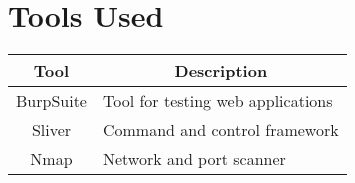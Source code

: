 \section{Tools Used}
\begin{fullwidth}
\begin{table}[htp]
\centering
\begin{tabular}{|c|l|}
\hline
\rowcolor[HTML]{C0C0C0} 
\textbf{Tool} & \multicolumn{1}{c|}{\cellcolor[HTML]{C0C0C0}\textbf{Description}}              \\ \hline
\rowcolor[HTML]{FFFFFF} 
BurpSuite     & \multicolumn{1}{p{5.6in}|}{\cellcolor[HTML]{FFFFFF}Tool for testing web applications} \\ \hline
Sliver & Command and control framework \\ \hline
Nmap   & Network and port scanner      \\ \hline
\end{tabular}
\end{table}
\end{fullwidth}